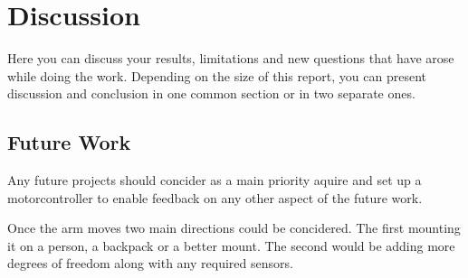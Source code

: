 \section{Discussion}
\label{section:disc}
Here you can discuss your results, limitations and new questions that have arose while doing the work. Depending on the size of this report, you can present discussion and conclusion in one common section or in two separate ones. 



\subsection{Future Work}

Any future projects should concider as a main priority aquire and set up a motorcontroller to enable feedback on any other aspect of the future work.

Once the arm moves two main directions could be concidered. The first mounting it on a person, a backpack or a better mount. The second would be adding more degrees of freedom along with any required sensors.

%
%
